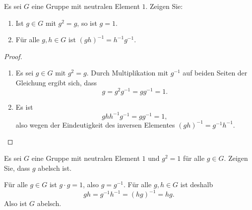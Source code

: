\begin{question}
 Es sei $G$ eine Gruppe mit neutralen Element $1$. Zeigen Sie:
 \begin{enumerate}
  \item
   Ist $g \in G$ mit $g^2 = g$, so ist $g = 1$.
  \item
   Für alle $g,h \in G$ ist $(gh)^{-1} = h^{-1} g^{-1}$.
 \end{enumerate}
\end{question}
\begin{proof}
 \begin{enumerate}
  \item
   Es sei $g \in G$ mit $g^2 = g$. Durch Multiplikation mit $g^{-1}$ auf beiden Seiten der Gleichung ergibt sich, dass
   \[
    g = g^2 g^{-1} = g g^{-1} = 1.
   \]
  \item
   Es ist
   \[
    gh h^{-1} g^{-1} = g g^{-1} = 1,
   \]
   also wegen der Eindeutigkeit des inversen Elementes $(gh)^{-1} = g^{-1} h^{-1}$.
  \qedhere
 \end{enumerate}
\end{proof}



\begin{question}
 Es sei $G$ eine Gruppe mit neutralen Element $1$ und $g^2 = 1$ für alle $g \in G$. Zeigen Sie, dass $g$ abelsch ist.
\end{question}
\begin{solution}
 Für alle $g \in G$ ist $g \cdot g = 1$, also $g = g^{-1}$. Für alle $g,h \in G$ ist deshalb
 \[
  gh = g^{-1} h^{-1} = (hg)^{-1} = hg.
 \]
 Also ist $G$ abelsch.
\end{solution}



